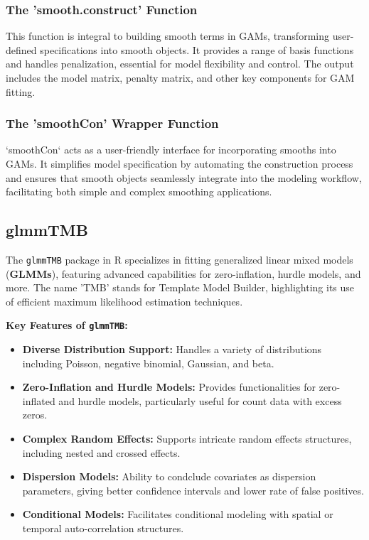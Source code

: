 \documentclass[12pt, twoside,hidelinks]{article}
\theoremstyle{definition}
\numberwithin{equation}{section}
\begin{document}
\subsubsection{The 'smooth.construct' Function}
This function is integral to building smooth terms in GAMs, transforming user-defined specifications into smooth objects. It provides a range of basis functions and handles penalization, essential for model flexibility and control. The output includes the model matrix, penalty matrix, and other key components for GAM fitting.

\subsubsection{The 'smoothCon' Wrapper Function}
`smoothCon` acts as a user-friendly interface for incorporating smooths into GAMs. It simplifies model specification by automating the construction process and ensures that smooth objects seamlessly integrate into the modeling workflow, facilitating both simple and complex smoothing applications.


\subsection{glmmTMB}

The \texttt{glmmTMB} \cite{glmmTMB} package in R specializes in fitting generalized linear mixed models (\textbf{GLMMs}), featuring advanced capabilities for zero-inflation, hurdle models, and more. The name 'TMB' stands for Template Model Builder, highlighting its use of efficient maximum likelihood estimation techniques.

\textbf{Key Features of \texttt{glmmTMB}:}
\begin{itemize}
    \item \textbf{Diverse Distribution Support:} Handles a variety of distributions including Poisson, negative binomial, Gaussian, and beta.
    \item \textbf{Zero-Inflation and Hurdle Models:} Provides functionalities for zero-inflated and hurdle models, particularly useful for count data with excess zeros.
    \item \textbf{Complex Random Effects:} Supports intricate random effects structures, including nested and crossed effects.
    \item \textbf{Dispersion Models:} Ability to condclude covariates as dispersion parameters, giving better confidence intervals and lower rate of false positives.
    \item \textbf{Conditional Models:} Facilitates conditional modeling with spatial or temporal auto-correlation structures.
\end{itemize}
\end{document}
